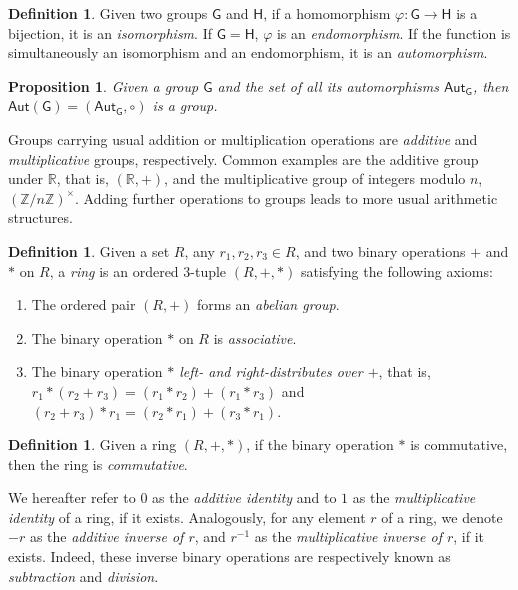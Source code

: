 \documentclass[12pt, a4paper, oneside]{memoir}
\newtheorem{proposition}[theorem]{Proposition}
\theoremstyle{definition}
\newtheorem{definition}[theorem]{Definition}
\begin{document}
\begin{definition}\label{def:group-iso}
  Given two groups $\mathsf{G}$ and $\mathsf{H}$, if a homomorphism $\varphi : \mathsf{G} \to \mathsf{H}$ is a bijection, it is an \emph{isomorphism}. If $\mathsf{G} = \mathsf{H}$, $\varphi$ is an \emph{endomorphism}. If the function is simultaneously an isomorphism and an endomorphism, it is an \emph{automorphism}.
\end{definition}

\begin{proposition}\label{prop:group-aut}
  Given a group $\mathsf{G}$ and the set of all its automorphisms $\mathsf{Aut}_{\mathsf{G}}$, then $\mathsf{Aut}(\mathsf{G}) = (\mathsf{Aut}_{\mathsf{G}}, \circ)$ is a group.
\end{proposition}

Groups carrying usual addition or multiplication operations are \emph{additive} and \emph{multiplicative} groups, respectively. Common examples are the additive group under $\mathbb{R}$, that is, $(\mathbb{R}, +)$, and the multiplicative group of integers modulo $n$, $(\mathbb{Z}/n\mathbb{Z})^{\times}$. Adding further operations to groups leads to more usual arithmetic structures.

\begin{definition}
  Given a set $R$, any $r_{1}, r_{2}, r_{3} \in R$, and two binary operations $+$ and $\ast$ on $R$, a \emph{ring} is an ordered 3-tuple $(R, +, \ast)$ satisfying the following axioms:
  
  \begin{enumerate}
    \item The ordered pair $(R, +)$ forms an \emph{abelian group}.
    \item The binary operation $\ast$ on $R$ is \emph{associative}.
    \item The binary operation \emph{$\ast$ left- and right-distributes over $+$}, that is, $r_{1} \ast (r_{2} + r_{3}) = (r_{1} \ast r_{2}) + (r_{1} \ast r_{3})$ and $(r_{2} + r_{3}) \ast r_{1} = (r_{2} \ast r_{1}) + (r_{3} \ast r_{1})$.
  \end{enumerate}
\end{definition}

\begin{definition}
  Given a ring $(R, +, \ast)$, if the binary operation $\ast$ is commutative, then the ring is \emph{commutative}.
\end{definition}

We hereafter refer to $0$ as the \emph{additive identity} and to $1$ as the \emph{multiplicative identity} of a ring, if it exists. Analogously, for any element $r$ of a ring, we denote $-r$ as the \emph{additive inverse of $r$}, and $r^{-1}$ as the \emph{multiplicative inverse of $r$}, if it exists. Indeed, these inverse binary operations are respectively known as \emph{subtraction} and \emph{division}.
\end{document}
